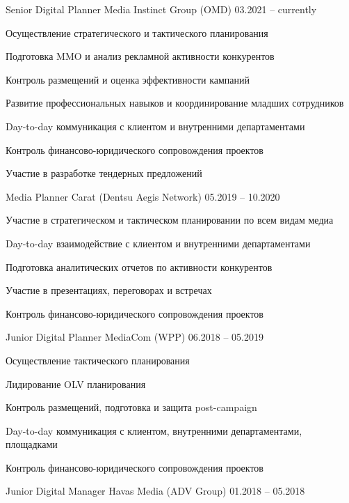 \documentclass[11pt, a4paper]{awesome-cv}
\begin{document}
\begin{cventries}

\cventry
	{Senior Digital Planner}
	{Media Instinct Group (OMD)}
	{}
	{03.2021 -- currently}
	{
		\begin{cvitems}
			\item {Осуществление стратегического и тактического планирования}
			\item {Подготовка MMO и анализ рекламной активности конкурентов}
			\item {Контроль размещений и оценка эффективности кампаний}
			\item {Развитие профессиональных навыков и координирование младших сотрудников }
			\item {Day-to-day коммуникация с клиентом и внутренними департаментами}
			\item {Контроль финансово-юридического сопровождения проектов}
			\item {Участие в разработке тендерных предложений}
		\end{cvitems}
	}

\cventry
	{Media Planner}
	{Carat (Dentsu Aegis Network)}
	{}
	{05.2019 -- 10.2020}
	{
		\begin{cvitems}
			\item {Участие в стратегическом и тактическом планировании по всем видам медиа}
			\item {Day-to-day взаимодействие с клиентом и внутренними департаментами}
			\item {Подготовка аналитических отчетов по активности конкурентов}
			\item {Участие в презентациях, переговорах и встречах}
			\item {Контроль финансово-юридического сопровождения проектов}
		\end{cvitems}
	}
	
\cventry
	{Junior Digital Planner}
	{MediaCom (WPP)}
	{}
	{06.2018 -- 05.2019}
	{
		\begin{cvitems}
			\item {Осуществление тактического планирования}
			\item {Лидирование OLV планирования}
			\item {Контроль размещений, подготовка и защита post-campaign}
			\item {Day-to-day коммуникация с клиентом, внутренними департаментами, площадками}
			\item {Контроль финансово-юридического сопровождения проектов}
		\end{cvitems}
	}

\cventry
	{Junior Digital Manager}
	{Havas Media (ADV Group)}
	{}
	{01.2018 -- 05.2018}
	{}

\end{cventries}
\end{document}
